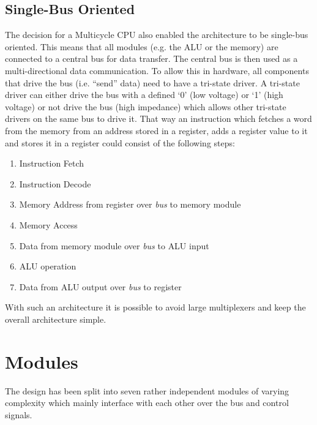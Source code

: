 \subsection{Single-Bus Oriented}
The decision for a Multicycle \gls{CPU} also enabled the architecture to be single-bus oriented.
This means that all modules (e.g. the \gls{ALU} or the memory) are connected to a central bus for data transfer.
The central bus is then used as a multi-directional data communication.
To allow this in hardware, all components that drive the bus (i.e. ``send'' data) need to have a tri-state driver.
A tri-state driver can either drive the bus with a defined `0' (low voltage) or `1' (high voltage) or not drive the bus (high impedance) which allows other tri-state drivers on the same bus to drive it.
That way an instruction which fetches a word from the memory from an address stored in a register, adds a register value to it and stores it in a register could consist of the following steps:
\begin{enumerate}
  \item Instruction Fetch
  \item Instruction Decode
  \item Memory Address from register over \emph{bus} to memory module
  \item Memory Access
  \item Data from memory module over \emph{bus} to \gls{ALU} input
  \item \gls{ALU} operation
  \item Data from \gls{ALU} output over \emph{bus} to register
\end{enumerate}
With such an architecture it is possible to avoid large multiplexers and keep the overall architecture simple.


\section{Modules}
The design has been split into seven rather independent modules of varying complexity which mainly interface with each other over the bus and control signals.
